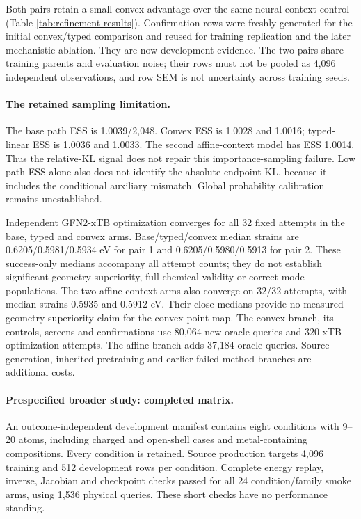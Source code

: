 Both pairs retain a small convex advantage over the same-neural-context
control (Table \ref{tab:refinement-results}). Confirmation rows were freshly
generated for the initial convex/typed comparison and reused for training
replication and the later mechanistic ablation. They are now development
evidence. The two pairs share training parents and evaluation noise; their
rows must not be pooled as 4,096 independent observations, and row SEM is not
uncertainty across training seeds.

\paragraph{The retained sampling limitation.}
The base path ESS is 1.0039/2,048. Convex ESS is 1.0028 and 1.0016; typed-linear
ESS is 1.0036 and 1.0033. The second affine-context model has ESS 1.0014.
Thus the relative-KL signal does not repair this importance-sampling failure.
Low path ESS alone also does not identify the absolute endpoint KL, because
it includes the conditional auxiliary mismatch. Global probability calibration
remains unestablished.

Independent GFN2-xTB optimization converges for all 32 fixed attempts in the
base, typed and convex arms. Base/typed/convex median strains are
0.6205/0.5981/0.5934 eV for pair 1 and 0.6205/0.5980/0.5913 for pair 2.
These success-only medians accompany all attempt counts; they do not establish
significant geometry superiority, full chemical validity or correct mode
populations. The two affine-context arms also converge on 32/32 attempts,
with median strains 0.5935 and 0.5912 eV. Their close medians provide no
measured geometry-superiority claim for the convex point map.
The convex branch, its controls, screens and confirmations use 80,064 new oracle
queries and 320 xTB optimization attempts. The affine branch adds 37,184 oracle
queries. Source generation, inherited pretraining and earlier failed method
branches are additional costs.

\paragraph{Prespecified broader study: completed matrix.}
An outcome-independent development manifest contains eight conditions with
9--20 atoms, including charged and open-shell cases and metal-containing
compositions. Every condition is retained. Source production targets 4,096
training and 512 development rows per condition. Complete energy replay, inverse,
Jacobian and checkpoint checks passed for all 24 condition/family smoke arms,
using 1,536 physical queries. These short checks have no performance standing.

